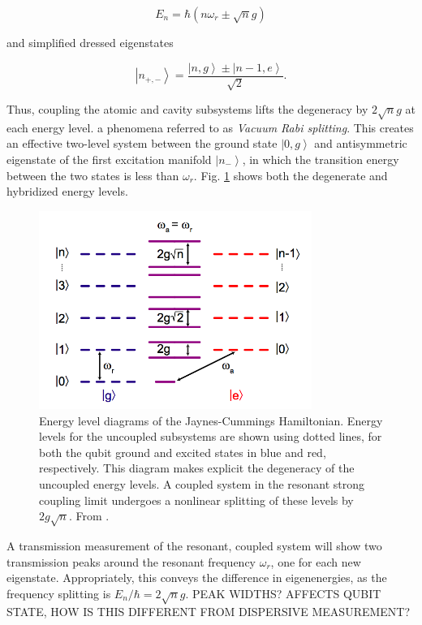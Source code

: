 \documentclass[11 pt, oneside]{book} %
\newcommand{\ket}[1]{\left| #1 \right>} %
\begin{document}
\begin{equation}\label{eq:NonlinearEnergies}
E_n = \hbar(n\omega_r\pm \sqrt{n}g)
\end{equation}

and simplified dressed eigenstates

\begin{equation}
\ket{n_{+,-}} = \frac{\ket{n,g}\pm\ket{n-1,e}}{\sqrt{2}}.
\end{equation}

Thus, coupling the atomic and cavity subsystems lifts the degeneracy by $2\sqrt{n}g$ at each energy level. a phenomena referred to as \emph{Vacuum Rabi splitting}. This creates an effective two-level system between the ground state $\ket{0,g}$ and antisymmetric eigenstate of the first excitation manifold $\ket{n_-}$, in which the transition energy between the two states is less than $\omega_r$. Fig. \ref{fig:EnergyLevels} shows both the degenerate and hybridized energy levels. 

\begin{figure}[h] 
   \centering
   \includegraphics[width=3.5in]{SchusterResonantEnergyLevels.png} 
   \caption[Energy levels of JC Hamiltonian]{Energy level diagrams of the Jaynes-Cummings Hamiltonian. Energy levels for the uncoupled subsystems are shown using dotted lines, for both the qubit ground and excited states in blue and red, respectively. This diagram makes explicit the degeneracy of the uncoupled energy levels. A coupled system in the resonant strong coupling limit undergoes a nonlinear splitting of these levels by $2g\sqrt{n}$. From \cite{Schuster}.}
   \label{fig:EnergyLevels}
\end{figure}

A transmission measurement of the resonant, coupled system will show two transmission peaks around the resonant frequency $\omega_r$, one for each new eigenstate. Appropriately, this conveys the difference in eigenenergies, as the frequency splitting is $E_n/\hbar=2\sqrt{n}g$. PEAK WIDTHS? AFFECTS QUBIT STATE, HOW IS THIS DIFFERENT FROM DISPERSIVE MEASUREMENT?
\end{document}
